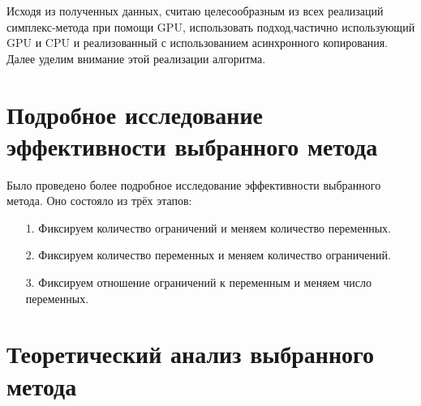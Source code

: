 \documentclass[a4paper,14pt,russian]{extreport}
\begin{document}
\par Исходя из полученных данных, считаю целесообразным из всех реализаций симплекс-метода при помощи GPU, использовать подход,частично использующий GPU и CPU и реализованный с использованием асинхронного копирования. Далее уделим внимание этой реализации алгоритма. 


\section{Подробное исследование эффективности выбранного метода}

Было проведено более подробное исследование эффективности выбранного метода. Оно состояло из трёх этапов:
  \begin{enumerate}
  \item[1.] Фиксируем количество ограничений и меняем количество переменных.
  \item[2.] Фиксируем количество переменных и меняем количество ограничений.
  \item[3.] Фиксируем отношение ограничений к переменным и меняем число переменных. 
  \end{enumerate}


\section{Теоретический анализ выбранного метода}
\end{document}
